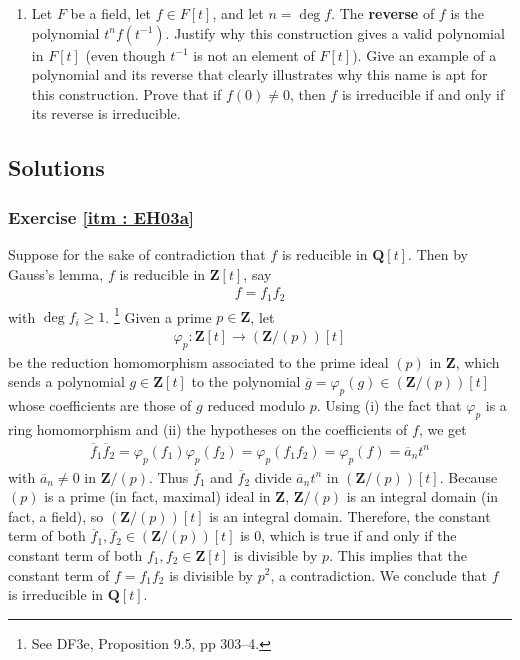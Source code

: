\documentclass[oneside, english, 11pt]{article}
\newcommand{\spaceSolution}[2]{#2}
\newcommand{\spaceSolution}[2]{\vspace{#1}}
\newcommand{\fontDefWord}[1]{\textbf{#1}}
\newcommand{\integers}{\mathbf{Z}}
\newcommand{\Q}{\rationals}
\newcommand{\rationals}{\mathbf{Q}}
\newcommand{\Z}{\integers}
\begin{document}
\begin{enumerate}[label=(\alph*)]
\item\label{itm : EH03e} Let $F$ be a field, let $f \in F[t]$, and let $n = \deg f$. The \fontDefWord{reverse} of $f$ is the polynomial $t^{n} f(t^{-1})$. Justify why this construction gives a valid polynomial in $F[t]$ (even though $t^{-1}$ is not an element of $F[t]$). Give an example of a polynomial and its reverse that clearly illustrates why this name is apt for this construction. Prove that if $f(0) \neq 0$, then $f$ is irreducible if and only if its reverse is irreducible.
\end{enumerate}



\spaceSolution{4in}{%
\subsection*{Solutions}

\subsubsection*{Exercise \ref{itm : EH03a}}

Suppose for the sake of contradiction that $f$ is reducible in $\Q[t]$. Then by Gauss's lemma, $f$ is reducible in $\Z[t]$, say
\begin{align}
f
=
f_{1} f_{2}%
\label{eq : EH03a Factorization}
\end{align}
with $\deg f_{i} \geq 1$.%
\footnote{See DF3e, Proposition 9.5, pp 303--4.} %
Given a prime $p \in \Z$, let
\begin{align*}
\varphi_{p}
:
\Z[t]
\rightarrow
(\Z / (p))[t]
\end{align*}
be the reduction homomorphism associated to the prime ideal $(p)$ in $\Z$, which sends a polynomial $g \in \Z[t]$ to the polynomial $\overline{g} = \varphi_{p}(g) \in (\Z / (p))[t]$ whose coefficients are those of $g$ reduced modulo $p$. Using (i) the fact that $\varphi_{p}$ is a ring homomorphism and (ii) the hypotheses on the coefficients of $f$, we get
\begin{align*}
\overline{f}_{1} \overline{f}_{2}
=
\varphi_{p}(f_{1}) \varphi_{p}(f_{2})
=
\varphi_{p}(f_{1} f_{2})
=
\varphi_{p}(f)
=
\overline{a}_{n} t^{n}
\end{align*}
with $\overline{a}_{n} \neq 0$ in $\Z / (p)$. Thus $\overline{f}_{1}$ and $\overline{f}_{2}$ divide $\overline{a}_{n} t^{n}$ in $(\Z / (p))[t]$. Because $(p)$ is a prime (in fact, maximal) ideal in $\Z$, $\Z / (p)$ is an integral domain (in fact, a field), so $(\Z / (p))[t]$ is an integral domain. Therefore, the constant term of both $\overline{f}_{1}, \overline{f}_{2} \in (\Z / (p))[t]$ is $0$, which is true if and only if the constant term of both $f_{1}, f_{2} \in \Z[t]$ is divisible by $p$. This implies that the constant term of $f = f_{1} f_{2}$ is divisible by $p^{2}$, a contradiction. We conclude that $f$ is irreducible in $\Q[t]$.

}
\end{document}
